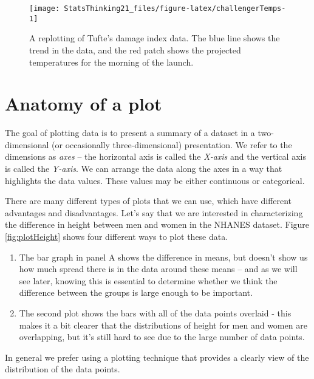 \documentclass[]{book}
\providecommand{\tightlist}{%
  \setlength{\itemsep}{0pt}\setlength{\parskip}{0pt}}
\theoremstyle{definition}
\theoremstyle{definition}
\theoremstyle{definition}
\theoremstyle{remark}
\begin{document}
\begin{figure}
\texttt{[image: StatsThinking21\_files/figure-latex/challengerTemps-1]} \caption{A replotting of Tufte's damage index data. The blue line shows the trend in the data, and the red patch shows the projected temperatures for the morning of the launch.}\label{fig:challengerTemps}
\end{figure}

\section{Anatomy of a plot}\label{anatomy-of-a-plot}

The goal of plotting data is to present a summary of a dataset in a
two-dimensional (or occasionally three-dimensional) presentation. We
refer to the dimensions as \emph{axes} -- the horizontal axis is called
the \emph{X-axis} and the vertical axis is called the \emph{Y-axis}. We
can arrange the data along the axes in a way that highlights the data
values. These values may be either continuous or categorical.

There are many different types of plots that we can use, which have
different advantages and disadvantages. Let's say that we are interested
in characterizing the difference in height between men and women in the
NHANES dataset. Figure \ref{fig:plotHeight} shows four different ways to
plot these data.

\begin{enumerate}
\def\labelenumi{\arabic{enumi}.}
\tightlist
\item
  The bar graph in panel A shows the difference in means, but doesn't
  show us how much spread there is in the data around these means -- and
  as we will see later, knowing this is essential to determine whether
  we think the difference between the groups is large enough to be
  important.\\
\item
  The second plot shows the bars with all of the data points overlaid -
  this makes it a bit clearer that the distributions of height for men
  and women are overlapping, but it's still hard to see due to the large
  number of data points.
\end{enumerate}

In general we prefer using a plotting technique that provides a clearly
view of the distribution of the data points.
\end{document}
